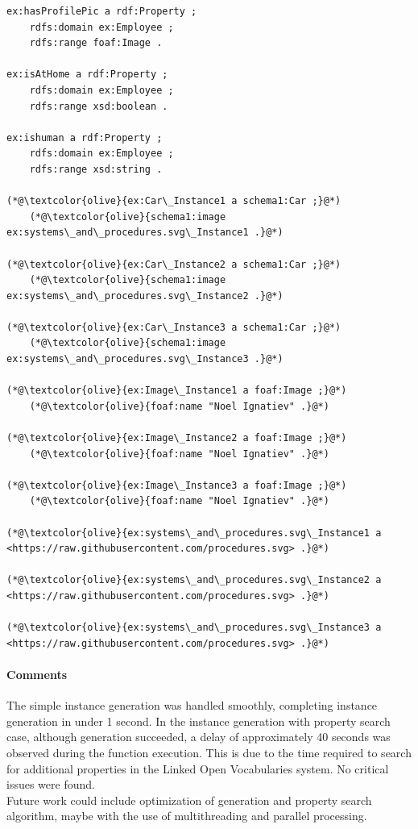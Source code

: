 \begin{lstlisting}[caption={Result Test Case 1.2}, label={lst:three-rdf-instances-extended}]
ex:hasProfilePic a rdf:Property ;
    rdfs:domain ex:Employee ;
    rdfs:range foaf:Image .

ex:isAtHome a rdf:Property ;
    rdfs:domain ex:Employee ;
    rdfs:range xsd:boolean .

ex:ishuman a rdf:Property ;
    rdfs:domain ex:Employee ;
    rdfs:range xsd:string .

(*@\textcolor{olive}{ex:Car\_Instance1 a schema1:Car ;}@*)
    (*@\textcolor{olive}{schema1:image ex:systems\_and\_procedures.svg\_Instance1 .}@*)

(*@\textcolor{olive}{ex:Car\_Instance2 a schema1:Car ;}@*)
    (*@\textcolor{olive}{schema1:image ex:systems\_and\_procedures.svg\_Instance2 .}@*)

(*@\textcolor{olive}{ex:Car\_Instance3 a schema1:Car ;}@*)
    (*@\textcolor{olive}{schema1:image ex:systems\_and\_procedures.svg\_Instance3 .}@*)

(*@\textcolor{olive}{ex:Image\_Instance1 a foaf:Image ;}@*)
    (*@\textcolor{olive}{foaf:name "Noel Ignatiev" .}@*)

(*@\textcolor{olive}{ex:Image\_Instance2 a foaf:Image ;}@*)
    (*@\textcolor{olive}{foaf:name "Noel Ignatiev" .}@*)

(*@\textcolor{olive}{ex:Image\_Instance3 a foaf:Image ;}@*)
    (*@\textcolor{olive}{foaf:name "Noel Ignatiev" .}@*)

(*@\textcolor{olive}{ex:systems\_and\_procedures.svg\_Instance1 a <https://raw.githubusercontent.com/procedures.svg> .}@*)

(*@\textcolor{olive}{ex:systems\_and\_procedures.svg\_Instance2 a <https://raw.githubusercontent.com/procedures.svg> .}@*)

(*@\textcolor{olive}{ex:systems\_and\_procedures.svg\_Instance3 a <https://raw.githubusercontent.com/procedures.svg> .}@*)
\end{lstlisting}

\paragraph{Comments}
The simple instance generation was handled smoothly, completing instance generation in under 1 second.  
In the instance generation with property search case, although generation succeeded, a delay of approximately 40 seconds was observed during the function execution.
This is due to the time required to search for additional properties in the Linked Open Vocabularies system.  
No critical issues were found. 
\\
Future work could include optimization of generation and property search algorithm, maybe with the use of multithreading and parallel processing.

